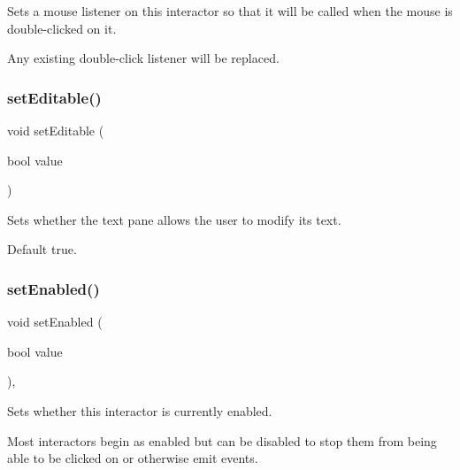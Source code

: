 Sets a mouse listener on this interactor so that it will be called when the mouse is double-\/clicked on it. 

Any existing double-\/click listener will be replaced. \mbox{\label{classGBrowserPane_a008d7fd44fb3e7a6886cdaddbc3644a2}} 
\subsubsection{\texorpdfstring{set\+Editable()}{setEditable()}}
{\footnotesize\ttfamily void set\+Editable (\begin{DoxyParamCaption}\item[{bool}]{value }\end{DoxyParamCaption})\hspace{0.3cm}{\ttfamily [virtual]}}



Sets whether the text pane allows the user to modify its text. 

Default true. \mbox{\label{classGInteractor_ab831367dd84bbd579e02e55bacb21343}} 
\subsubsection{\texorpdfstring{set\+Enabled()}{setEnabled()}}
{\footnotesize\ttfamily void set\+Enabled (\begin{DoxyParamCaption}\item[{bool}]{value }\end{DoxyParamCaption})\hspace{0.3cm}{\ttfamily [virtual]}, {\ttfamily [inherited]}}



Sets whether this interactor is currently enabled. 

Most interactors begin as enabled but can be disabled to stop them from being able to be clicked on or otherwise emit events. \mbox{\label{classGObservable_ad2f6d34961c50f6c1e0659990b79f741}} 

